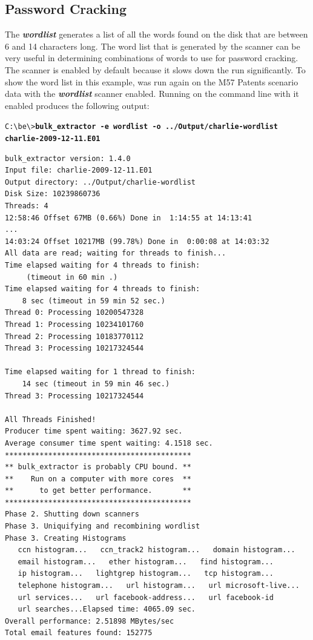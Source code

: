\subsection{Password Cracking}
The \textbf{\textit{wordlist}} generates a list of all the words found on the disk that are between 6 and 14 characters long. The word list that is generated by the scanner can be very useful in determining combinations of words to use for password cracking. The scanner is enabled by default because it slows down the \bulk run significantly.  To show the word list in this example, \bulk was run again on the M57 Patents scenario data with the \textbf{\textit{wordlist}} scanner enabled. Running \bulk on the command line with it enabled produces the following output:


\begingroup
\footnotesize
\texttt{C:\textbackslash be\textbackslash \textgreater \textbf{bulk\_extractor -e wordlist -o ../Output/charlie-wordlist charlie-2009-12-11.E01}}
\endgroup
\begingroup
\footnotesize
\begin{Verbatim}[fontfamily=courier, commandchars=\\\{\}]
bulk_extractor version: 1.4.0
Input file: charlie-2009-12-11.E01
Output directory: ../Output/charlie-wordlist
Disk Size: 10239860736
Threads: 4
12:58:46 Offset 67MB (0.66%) Done in  1:14:55 at 14:13:41
...
14:03:24 Offset 10217MB (99.78%) Done in  0:00:08 at 14:03:32
All data are read; waiting for threads to finish...
Time elapsed waiting for 4 threads to finish:
     (timeout in 60 min .)
Time elapsed waiting for 4 threads to finish:
    8 sec (timeout in 59 min 52 sec.)
Thread 0: Processing 10200547328
Thread 1: Processing 10234101760
Thread 2: Processing 10183770112
Thread 3: Processing 10217324544

Time elapsed waiting for 1 thread to finish:
    14 sec (timeout in 59 min 46 sec.)
Thread 3: Processing 10217324544

All Threads Finished!
Producer time spent waiting: 3627.92 sec.
Average consumer time spent waiting: 4.1518 sec.
*******************************************
** bulk_extractor is probably CPU bound. **
**    Run on a computer with more cores  **
**      to get better performance.       **
*******************************************
Phase 2. Shutting down scanners
Phase 3. Uniquifying and recombining wordlist
Phase 3. Creating Histograms
   ccn histogram...   ccn_track2 histogram...   domain histogram...
   email histogram...   ether histogram...   find histogram...
   ip histogram...   lightgrep histogram...   tcp histogram...
   telephone histogram...   url histogram...   url microsoft-live...
   url services...   url facebook-address...   url facebook-id
   url searches...Elapsed time: 4065.09 sec.
Overall performance: 2.51898 MBytes/sec
Total email features found: 152775
\end{Verbatim}
\endgroup

